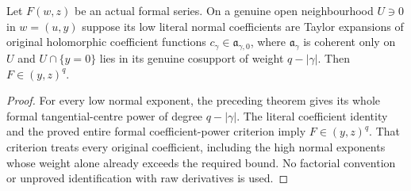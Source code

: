 \begin{theorem}
\label{hir:actual-local-coefficient-presentation-centre-power}
\leanok
Let $F(w,z)$ be an actual formal series. On a genuine open neighbourhood
$U\ni0$ in $w=(u,y)$ suppose its low literal normal coefficients are
Taylor expansions of original holomorphic coefficient functions
$c_\gamma\in\mathfrak a_{\gamma,0}$, where $\mathfrak a_\gamma$ is coherent
only on $U$ and $U\cap\{y=0\}$ lies in its genuine cosupport of weight
$q-|\gamma|$. Then $F\in(y,z)^q$.
\end{theorem}
\begin{proof}
For every low normal exponent, the preceding theorem gives its whole
formal tangential-centre power of degree $q-|\gamma|$. The literal
coefficient identity and the proved entire formal coefficient-power
criterion imply $F\in(y,z)^q$. That criterion treats every original
coefficient, including the high normal exponents whose weight alone
already exceeds the required bound. No factorial convention or unproved
identification with raw derivatives is used.
\end{proof}

